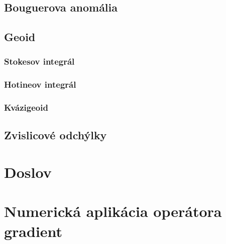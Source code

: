 \documentclass[a4paper,12pt]{book}
\begin{document}
\section{Bouguerova anomália}
\label{sec:bouguer_anomaly}






\section{Geoid}
\label{sec:geoid}


\subsection{Stokesov integrál}
\label{sec:stokes_integral}



\subsection{Hotineov integrál}
\label{sec:hotine_integral}



\subsection{Kvázigeoid}
\label{sec:quasigeoid}




\section{Zvislicové odchýlky}
\label{sec:deflections}







\chapter*{Doslov}







\appendix
\chapter{Numerická aplikácia operátora gradient}
\label{app:numerical_application_of_gradient}
\end{document}
